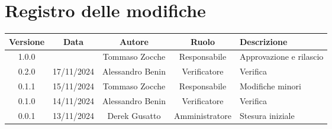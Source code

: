 
\section*{Registro delle modifiche}
\begin{table}[H]
    \begin{tabular}{|c|c|c|c|p{3cm}|}
        \hline
         \textbf{Versione} &  \textbf{Data} &  \textbf{Autore} &  \textbf{Ruolo} & \textbf{Descrizione} \\
        \hline
        1.0.0 &  & Tommaso Zocche & Responsabile & Approvazione e rilascio \\
        \hline
         0.2.0 & 17/11/2024 & Alessandro Benin & Verificatore & Verifica \\
        \hline
        0.1.1 & 15/11/2024 & Tommaso Zocche & Responsabile & Modifiche minori \\
        \hline
        0.1.0 & 14/11/2024 & Alessandro Benin & Verificatore & Verifica \\
        \hline
        0.0.1 & 13/11/2024 & Derek Gusatto & Amministratore  & Stesura iniziale \\
              \hline
    \end{tabular}
\end{table}
